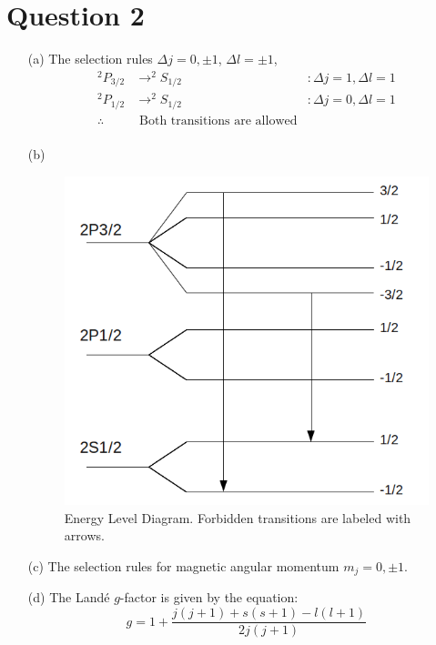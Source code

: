 \documentclass[10pt,a4paper]{article}
\begin{document}
\section*{Question 2}
\begin{itemize}
	\item[(a)] The selection rules $\Delta j = 0, \pm 1$, $\Delta l = \pm 1$,
		\begin{align*}
			^{2}P_{3/2} &\rightarrow ^{2}S_{1/2} &: \Delta j = 1, \Delta l = 1  \\
			^{2}P_{1/2} &\rightarrow ^{2}S_{1/2} &: \Delta j = 0, \Delta l = 1  \\
			\therefore &\mbox{ Both transitions are allowed}& \\
		\end{align*}
	
	\item[(b)] 
		\begin{figure}[!h]
			\begin{center}
				\includegraphics[width=0.8\linewidth]{energyLevels.png}
			\end{center}
			\caption{Energy Level Diagram. Forbidden transitions are labeled with arrows.}
		\end{figure}

	\item[(c)] The selection rules for magnetic angular momentum $m_{j} = 0, \pm 1$.

	\item[(d)] The Land\' e $g$-factor is given by the equation:
		\begin{equation*}
			g = 1 + \frac{j(j+1)+s(s+1)-l(l+1)}{2j(j+1)}
		\end{equation*}
	

\end{itemize}
\end{document}
